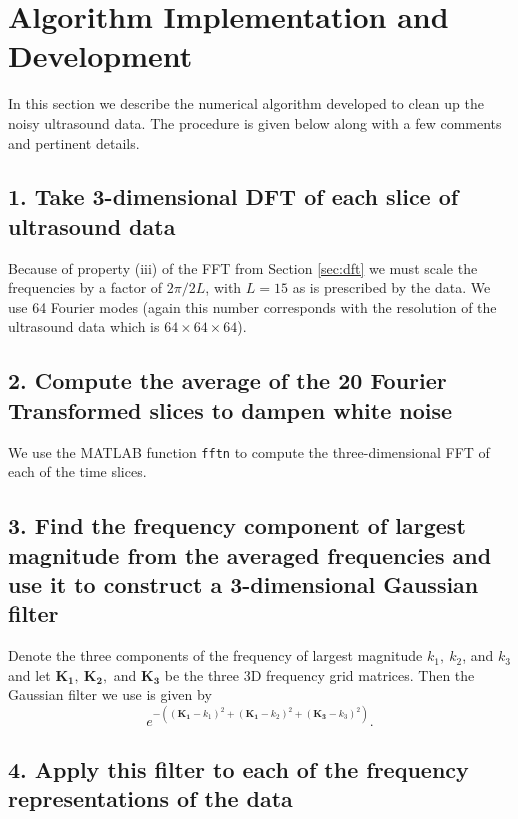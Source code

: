 \documentclass[fleqn,10pt]{SelfArx} %
\begin{document}


\section{Algorithm Implementation and Development} %
\label{sec:algorithm_implementation_and_development}
In this section we describe the numerical algorithm developed to clean up the noisy ultrasound data. The procedure is given below along with a few comments and pertinent details.


\subsection*{1. Take 3-dimensional DFT of each slice of ultrasound data}
Because of property (iii) of the FFT from Section \ref{sec:dft} we must scale the frequencies by a factor of $2\pi / 2L$, with $L=15$ as is prescribed by the data. We use 64 Fourier modes (again this number corresponds with the resolution of the ultrasound data which is $64\times64\times64$).

\subsection*{2. Compute the average of the 20 Fourier Transformed slices to dampen white
			noise}
We use the MATLAB function \texttt{fftn} to compute the three-dimensional FFT of each of the time slices.

\subsection*{3. Find the frequency component of largest magnitude from the averaged 
			frequencies and use it to construct a 3-dimensional Gaussian filter}
Denote the three components of the frequency of largest magnitude $k_1,~k_2$, and $k_3$ and let $\boldsymbol{K_1},~\boldsymbol{K_2},$ and $\boldsymbol{K_3}$ be the three 3D frequency grid matrices. Then the Gaussian filter we use is given by
\begin{equation}
e^{-\left((\boldsymbol{K_1}-k_1)^2 + (\boldsymbol{K_1}-k_2)^2 + (\boldsymbol{K_3}-k_3)^2\right)}.
\end{equation}

\subsection*{4. Apply this filter to each of the frequency representations of the data}
\vskip 0.5cm
\end{document}
